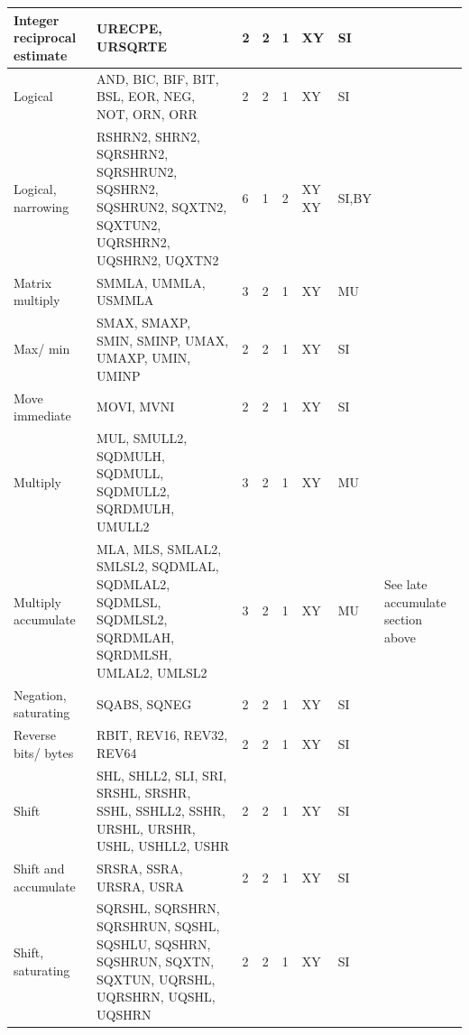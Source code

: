 \begin{longtable}{|p{1in}|p{1in}|l|l|l|p{1in}|l|p{1in}|}
\hline
Integer reciprocal estimate & URECPE, URSQRTE & 2 & 2 & 1 & XY & SI & \\
\hline
Logical & AND, BIC, BIF, BIT, BSL, EOR, NEG, NOT, ORN, ORR & 2 & 2 & 1 & XY & SI & \\
\hline
Logical, narrowing & RSHRN{{2}}, SHRN{{2}}, SQRSHRN{{2}}, SQRSHRUN{{2}}, SQSHRN{{2}}, SQSHRUN{{2}}, SQXTN{{2}}, SQXTUN{{2}}, UQRSHRN{{2}}, UQSHRN{{2}}, UQXTN{{2}} & 6 & 1 & 2 & XY XY & SI,BY & \\
\hline
Matrix multiply & SMMLA, UMMLA, USMMLA & 3 & 2 & 1 & XY & MU & \\
\hline
Max/ min & SMAX, SMAXP, SMIN, SMINP, UMAX, UMAXP, UMIN, UMINP & 2 & 2 & 1 & XY & SI & \\
\hline
Move immediate & MOVI, MVNI & 2 & 2 & 1 & XY & SI & \\
\hline
Multiply & MUL, SMULL{{2}}, SQDMULH, SQDMULL, SQDMULL{{2}}, SQRDMULH, UMULL{{2}} & 3 & 2 & 1 & XY & MU & \\
\hline
Multiply accumulate & MLA, MLS, SMLAL{{2}}, SMLSL{{2}}, SQDMLAL, SQDMLAL{{2}}, SQDMLSL, SQDMLSL{{2}}, SQRDMLAH, SQRDMLSH, UMLAL{{2}}, UMLSL{{2}} & 3 & 2 & 1 & XY & MU & See late accumulate section above\\
\hline
Negation, saturating & SQABS, SQNEG & 2 & 2 & 1 & XY & SI & \\
\hline
Reverse bits/ bytes & RBIT, REV16, REV32, REV64 & 2 & 2 & 1 & XY & SI & \\
\hline
Shift & SHL, SHLL{{2}}, SLI, SRI, SRSHL, SRSHR, SSHL, SSHLL{{2}}, SSHR, URSHL, URSHR, USHL, USHLL{{2}}, USHR & 2 & 2 & 1 & XY & SI & \\
\hline
Shift and accumulate & SRSRA, SSRA, URSRA, USRA & 2 & 2 & 1 & XY & SI & \\
\hline
Shift, saturating & SQRSHL, SQRSHRN, SQRSHRUN, SQSHL, SQSHLU, SQSHRN, SQSHRUN, SQXTN, SQXTUN, UQRSHL, UQRSHRN, UQSHL, UQSHRN & 2 & 2 & 1 & XY & SI & \\
\hline
\end{longtable}
